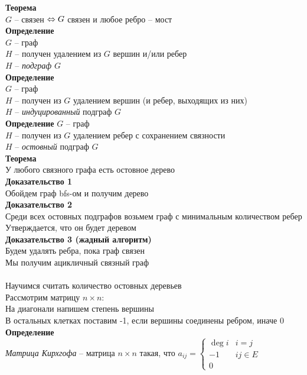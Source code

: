 \documentclass[12pt]{article}
\begin{document}
\textbf{Теорема}\\
$G$ -- связен $\Leftrightarrow G$ связен и любое ребро -- мост\\
\textbf{Определение}\\
$G$ -- граф\\
$H$ -- получен удалением из $G$ вершин и/или ребер\\
$H$ -- \textit{подграф} $G$\\
\textbf{Определение}\\
$G$ -- граф\\
$H$ -- получен из $G$ удалением вершин (и ребер, выходящих из них)\\
$H$ -- \textit{индуцированный} подграф $G$\\
\textbf{Определение}
$G$ -- граф\\
$H$ -- получен из $G$ удалением ребер с сохранением связности\\
$H$ -- \textit{остовный} подграф $G$\\
\textbf{Теорема}\\
У любого связного графа есть остовное дерево\\
\textbf{Доказательство 1}\\
Обойдем граф bfs-ом и получим дерево\\
\textbf{Доказательство 2}\\
Среди всех остовных подграфов возьмем граф с минимальным количеством ребер\\
Утверждается, что он будет деревом\\
\textbf{Доказательство 3 (жадный алгоритм)}\\
Будем удалять ребра, пока граф связен\\
Мы получим ацикличный связный граф\\\\
Научимся считать количество остовных деревьев\\
Рассмотрим матрицу $n\times n$:\\
На диагонали напишем степень вершины\\
В остальных клетках поставим -1, если вершины соединены ребром, иначе 0\\
\textbf{Определение}\\
\textit{Матрица Кирхгофа} -- матрица $n\times n$ такая, что $a_{ij} = \left\{\begin{array}{cc}
    \deg i & i = j\\
    -1 & ij\in E\\
    0 & 
\end{array}\right.$\\
\end{document}
